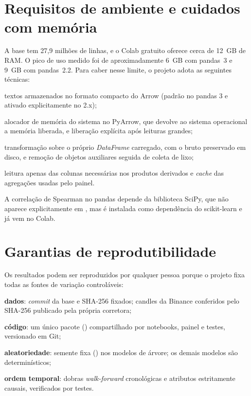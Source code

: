 \section{Requisitos de ambiente e cuidados com memória}\label{sec:memoria}

A base tem 27,9 milhões de linhas, e o Colab gratuito oferece cerca de 12~GB de
RAM. O pico de uso medido foi de aproximadamente 6~GB com pandas~3 e 9~GB com
pandas~2.2. Para caber nesse limite, o projeto adota as seguintes técnicas:

\begin{alineas}
  \item textos armazenados no formato compacto do Arrow (padrão no pandas 3 e
        ativado explicitamente no 2.x);
  \item alocador de memória do sistema no PyArrow, que devolve ao sistema
        operacional a memória liberada, e liberação explícita após leituras
        grandes;
  \item transformação sobre o próprio \textit{DataFrame} carregado, com o bruto
        preservado em disco, e remoção de objetos auxiliares seguida de coleta de
        lixo;
  \item leitura apenas das colunas necessárias nos produtos derivados e
        \textit{cache} das agregações usadas pelo painel.
\end{alineas}

A correlação de Spearman no pandas depende da biblioteca SciPy, que não aparece
explicitamente em , mas é instalada como dependência do
scikit-learn e já vem no Colab.

\section{Garantias de reprodutibilidade}\label{sec:garantias}

Os resultados podem ser reproduzidos por qualquer pessoa porque o projeto fixa
todas as fontes de variação controláveis:

\begin{alineas}
  \item \textbf{dados}: \textit{commit} da base e SHA-256 fixados; candles da
        Binance conferidos pelo SHA-256 publicado pela própria corretora;
  \item \textbf{código}: um único pacote () compartilhado por
        notebooks, painel e testes, versionado em Git;
  \item \textbf{aleatoriedade}: semente fixa () nos modelos
        de árvore; os demais modelos são determinísticos;
  \item \textbf{ordem temporal}: dobras \textit{walk-forward} cronológicas e
        atributos estritamente causais, verificados por testes.
\end{alineas}

